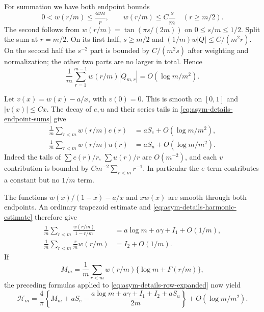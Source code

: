 For summation we have both endpoint bounds
\begin{equation}\label{eq:asym-details-weight-bounds}
 0<w(r/m)\leq\frac{am}{r},\qquad
 w(r/m)\leq C\frac{s}{m}\quad(r\geq m/2).
\end{equation}
The second follows from $w(r/m)=\tan(\pi s/(2m))$ on
$0\leq s/m\leq1/2$.  Split the sum at $r=m/2$.  On its first
half, $s\geq m/2$ and
$(1/m)w|Q|\leq C/(m^2r)$.  On the second half the $s^{-2}$
part is bounded by $C/(m^2s)$ after weighting and normalization;
the other two parts are no larger in total.  Hence
\begin{equation}\label{eq:asym-details-weighted-row-error}
 \frac1m\sum_{r=1}^{m-1}w(r/m)|Q_{m,r}|
          =O(\log m/m^2).
\end{equation}

Let $v(x)=w(x)-a/x$, with $v(0)=0$.  This is smooth on $[0,1]$
and $|v(x)|\leq Cx$.  The decay of $e,u$ and their series tails
in \eqref{eq:asym-details-endpoint-sums} give
\begin{align}
 \frac1m\sum_{r<m}w(r/m)e(r)&=aS_e+O(\log m/m^2),
 \label{eq:asym-details-e-weighted}\\
 \frac1m\sum_{r<m}w(r/m)u(r)&=aS_u+O(\log m/m^2).
 \label{eq:asym-details-u-weighted}
\end{align}
Indeed the tails of $\sum e(r)/r$, $\sum u(r)/r$ are
$O(m^{-2})$, and each $v$ contribution is bounded by
$Cm^{-2}\sum_{r<m}r^{-1}$.  In particular the $e$ term contributes
a constant but no $1/m$ term.

The functions $w(x)/(1-x)-a/x$ and $xw(x)$ are smooth through
both endpoints.  An ordinary trapezoid estimate and
\eqref{eq:asym-details-harmonic-estimate} therefore give
\begin{align}
 \frac1m\sum_{r<m}\frac{w(r/m)}{1-r/m}
       &=a\log m+a\gamma+I_1+O(1/m),
 \label{eq:asym-details-I1-sum}\\
 \frac1m\sum_{r<m}\frac rm w(r/m)&=I_2+O(1/m).
 \label{eq:asym-details-I2-sum}
\end{align}
If
\[
 M_m=\frac1m\sum_{r<m}w(r/m)\{\log m+F(r/m)\},
\]
the preceding formulas applied to
\eqref{eq:asym-details-row-expanded} now yield
\begin{equation}\label{eq:asym-details-H-to-M}
 \mathcal H_m=\frac4\pi\left\{
 M_m+aS_e-\frac{a\log m+a\gamma+I_1+I_2+aS_u}{2m}
                         \right\}+O(\log m/m^2).
\end{equation}

